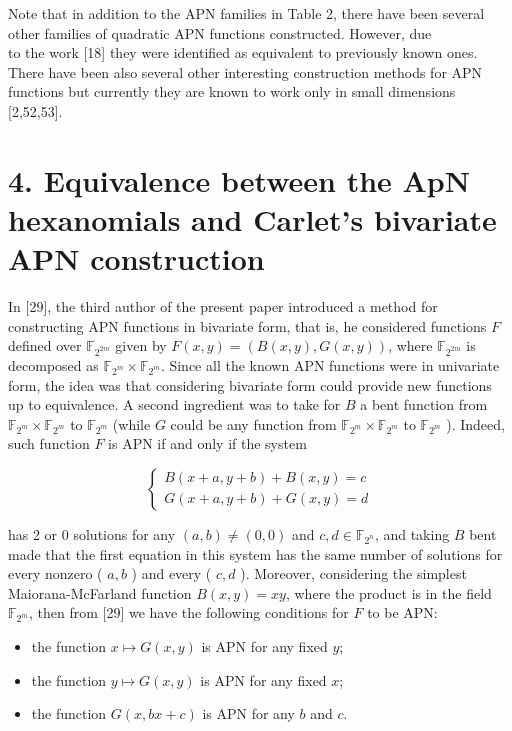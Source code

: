 \documentclass[10pt]{article}
\begin{document}
Note that in addition to the APN families in Table 2, there have been several other families of quadratic APN functions constructed. However, due\\[0pt]
to the work [18] they were identified as equivalent to previously known ones. There have been also several other interesting construction methods for APN functions but currently they are known to work only in small dimensions [2,52,53].

\section*{4. Equivalence between the ApN hexanomials and Carlet's bivariate APN construction}
In [29], the third author of the present paper introduced a method for constructing APN functions in bivariate form, that is, he considered functions $F$ defined over $\mathbb{F}_{2^{2 m}}$ given by $F(x, y)=(B(x, y), G(x, y))$, where $\mathbb{F}_{2^{2 m}}$ is decomposed as $\mathbb{F}_{2^{m}} \times \mathbb{F}_{2^{m}}$. Since all the known APN functions were in univariate form, the idea was that considering bivariate form could provide new functions up to equivalence. A second ingredient was to take for $B$ a bent function from $\mathbb{F}_{2^{m}} \times \mathbb{F}_{2^{m}}$ to $\mathbb{F}_{2^{m}}$ (while $G$ could be any function from $\mathbb{F}_{2^{m}} \times \mathbb{F}_{2^{m}}$ to $\mathbb{F}_{2^{m}}$ ). Indeed, such function $F$ is APN if and only if the system

$$
\left\{\begin{array}{l}
B(x+a, y+b)+B(x, y)=c \\
G(x+a, y+b)+G(x, y)=d
\end{array}\right.
$$

has 2 or 0 solutions for any $(a, b) \neq(0,0)$ and $c, d \in \mathbb{F}_{2^{n}}$, and taking $B$ bent made that the first equation in this system has the same number of solutions for every nonzero ( $a, b$ ) and every ( $c, d$ ). Moreover, considering the simplest Maiorana-McFarland function $B(x, y)=x y$, where the product is in the field $\mathbb{F}_{2^{m}}$, then from [29] we have the following conditions for $F$ to be APN:

\begin{itemize}
  \item the function $x \mapsto G(x, y)$ is APN for any fixed $y$;
  \item the function $y \mapsto G(x, y)$ is APN for any fixed $x$;
  \item the function $G(x, b x+c)$ is APN for any $b$ and $c$.
\end{itemize}
\end{document}
